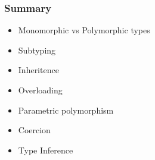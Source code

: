 \begin{frame}
\frametitle{Summary}
\begin{itemize}
\item Monomorphic vs Polymorphic types
\item Subtyping
\item Inheritence
\item Overloading
\item Parametric polymorphism
\item Coercion
\item Type Inference
\end{itemize}
\end{frame}

